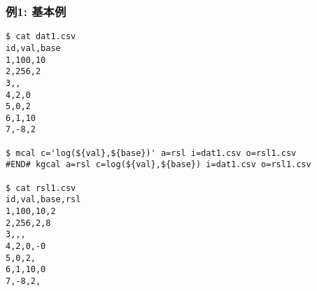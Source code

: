 
\subsubsection*{例1: 基本例}


\begin{Verbatim}[baselinestretch=0.7,frame=single]
$ cat dat1.csv
id,val,base
1,100,10
2,256,2
3,,
4,2,0
5,0,2
6,1,10
7,-8,2

$ mcal c='log(${val},${base})' a=rsl i=dat1.csv o=rsl1.csv
#END# kgcal a=rsl c=log(${val},${base}) i=dat1.csv o=rsl1.csv

$ cat rsl1.csv
id,val,base,rsl
1,100,10,2
2,256,2,8
3,,,
4,2,0,-0
5,0,2,
6,1,10,0
7,-8,2,
\end{Verbatim}
